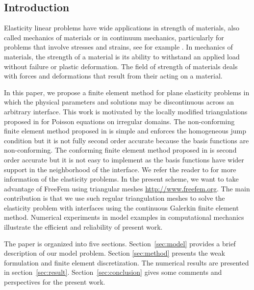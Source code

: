 \documentclass[notitlepage,a4paper,fleqn,9pt]{icmfarticle}
\begin{document}
\begin{multicols}{2}
\section{Introduction}
\label{sec:introduction}
Elasticity linear problems have wide applications in strength of materials, also called mechanics of materials or in continuum mechanics, particularly for problems that involve stresses and strains, see for example \cite{Yu86,FS96}. In mechanics of materials, the strength of a material is its ability to withstand an applied load without failure or plastic deformation. The field of strength of materials deals with forces and deformations that result from their acting on a material.

In this paper, we propose a finite element method for plane elasticity problems in which the physical parameters and solutions may be discontinuous across an arbitrary interface. This work is motivated by the locally modified triangulations proposed in \cite{Bor90, XILT08} for Poisson equations on irregular domains. The non-conforming finite element method proposed in \cite{LLW03} is simple and enforces the homogeneous jump condition but it is not fully second order accurate because the basis functions are non-conforming. The conforming finite element method proposed in \cite{GLL08, LLW03} is second order accurate but it is not easy to implement as the basis functions have wider support in the neighborhood of the interface. 
We refer the reader to \cite{TG85,Sad05} for more information of the elasticity problems.
In the present scheme, we want to take advantage of FreeFem using triangular meshes \url{http://www.freefem.org}. The main contribution is that we use such regular triangulation meshes to solve the elasticity problem with interfaces using the continuous Galerkin finite element method. Numerical experiments in model examples in computational mechanics illustrate the efficient and reliability of present work.

The paper is organized into five sections. Section~\ref{sec:model} provides a brief description of our model problem. Section \ref{sec:method} presents the weak formulation and finite element discretization. The numerical results are presented in section~\ref{sec:result}. Section~\ref{sec:conclusion} gives some comments and perspectives for the present work.

\end{multicols}
\end{document}
